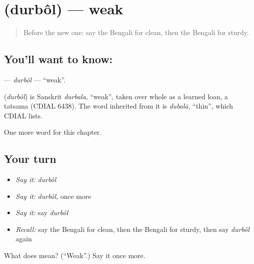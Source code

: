 \section[\texorpdfstring{\bn{দুর্বল} (durbôl)}{দুর্বল (durbôl)}]{ (durbôl) — weak}

\label{lesson:BN-C142-durbol}



\begin{quote}
Before the new one: say the Bengali for clean, then the Bengali for sturdy.
\end{quote}

\subsection*{You'll want to know: }
\textbf{} — \emph{durbôl} — \textquotedblleft{}weak\textquotedblright{}.

\begin{cousinweb}
\textbf{} (\emph{durbôl}) is Sanskrit \emph{durbala}, \textquotedblleft{}weak\textquotedblright{}, taken over whole as a learned loan, a tatsama (CDIAL 6438). The word inherited from it is \emph{dubalā}, \textquotedblleft{}thin\textquotedblright{}, which CDIAL lists.
\end{cousinweb}

\begin{grammarlens}[title={What you've built}]
One more word for this chapter.
\end{grammarlens}

\subsection*{Your turn}
\begin{itemize}
\raggedright
  \item \emph{Say it:} \emph{durbôl}
  \item \emph{Say it:} \emph{durbôl}, once more
  \item \emph{Say it:} say \emph{durbôl}
  \item \emph{Recall:} say the Bengali for clean, then the Bengali for sturdy, then say \emph{durbôl} again
\end{itemize}

\begin{tcolorbox}[breakable,colback=teal!4,colframe=teal!35!black,title={Before you move on}]
What does  mean? (\textquotedblleft{}Weak\textquotedblright{}.) Say it once more.
\end{tcolorbox}

